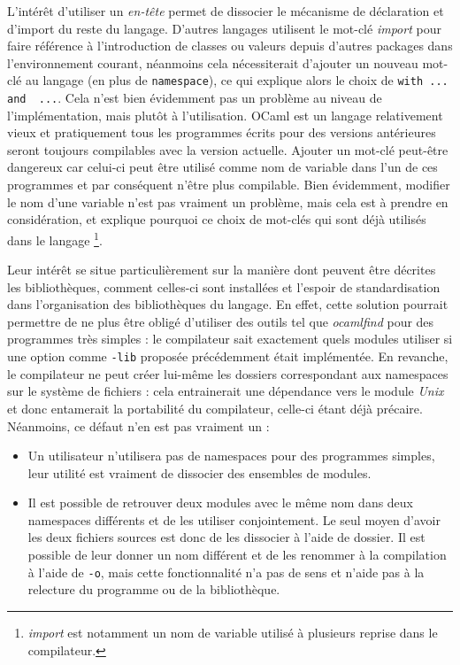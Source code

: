 \documentclass[11pt,a4paper]{report}
\begin{document}
L'intérêt d'utiliser un \emph{en-tête} permet de dissocier le mécanisme de
déclaration et d'import du reste du langage. D'autres langages utilisent le
mot-clé \emph{import} pour faire référence à l'introduction de classes ou
valeurs depuis d'autres packages dans l'environnement courant, néanmoins cela
nécessiterait d'ajouter un nouveau mot-clé au langage (en plus de
\texttt{namespace}), ce qui explique alors le choix de 
\lstinline{with ... and  ...}. 
Cela n'est bien évidemment pas un problème au niveau de
l'implémentation, mais plutôt à l'utilisation. OCaml est un langage relativement
vieux et pratiquement tous les programmes écrits pour des versions antérieures
seront toujours compilables avec la version actuelle. Ajouter un mot-clé
peut-être dangereux car celui-ci peut être utilisé comme nom de variable dans
l'un de ces programmes et par conséquent n'être plus compilable. Bien
évidemment, modifier le nom d'une variable n'est pas vraiment un problème, mais
cela est à prendre en considération, et explique pourquoi ce choix de mot-clés
qui sont déjà utilisés dans le langage \footnote{\emph{import} est notamment un
  nom de variable utilisé à plusieurs reprise dans le compilateur.}.

Leur intérêt se situe particulièrement sur la manière dont peuvent être décrites
les bibliothèques, comment celles-ci sont installées et l'espoir de
standardisation dans l'organisation des bibliothèques du langage. En effet,
cette solution pourrait permettre de ne plus être obligé d'utiliser des outils
tel que \emph{ocamlfind} pour des programmes très simples : le compilateur sait
exactement quels modules utiliser si une option comme \texttt{-lib} proposée
précédemment était implémentée. En revanche, le compilateur ne peut créer
lui-même les dossiers correspondant aux namespaces sur le système de fichiers :
cela entrainerait une dépendance vers le module \emph{Unix} et donc entamerait
la portabilité du compilateur, celle-ci étant déjà précaire. Néanmoins, ce
défaut n'en est pas vraiment un :
\begin{itemize}
\item Un utilisateur n'utilisera pas de namespaces pour des programmes simples,
  leur utilité est vraiment de dissocier des ensembles de modules.
\item Il est possible de retrouver deux modules avec le même nom dans deux
  namespaces différents et de les utiliser conjointement. Le seul moyen d'avoir
  les deux fichiers sources est donc de les dissocier à l'aide de dossier. Il
  est possible de leur donner un nom différent et de les renommer à la
  compilation à l'aide de \texttt{-o}, mais cette fonctionnalité n'a pas de sens
  et n'aide pas à la relecture du programme ou de la bibliothèque.
\end{itemize}
\end{document}
